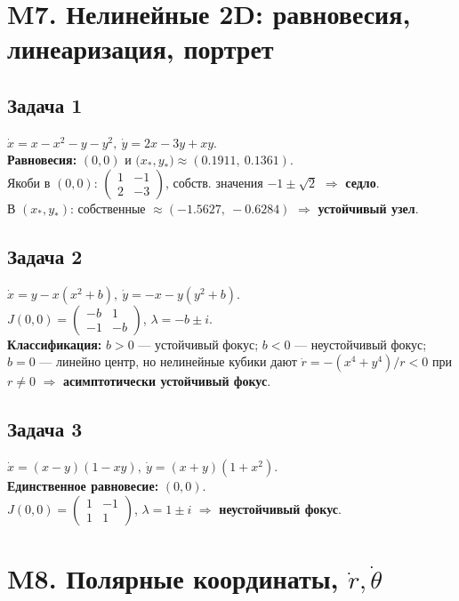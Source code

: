 \documentclass[12pt]{article}
\begin{document}
\section*{M7. Нелинейные 2D: равновесия, линеаризация, портрет}

\subsection*{Задача 1}
$\dot x=x-x^2-y-y^2,\ \dot y=2x-3y+xy$. \\
\textbf{Равновесия: } $(0,0)$ и $\bigl(x_*,y_*\bigr)\approx(0.1911,\ 0.1361)$. \\
Якоби в $(0,0)$: $\begin{pmatrix}1&-1\\2&-3\end{pmatrix}$, собств. значения $-1\pm\sqrt2$ $\Rightarrow$ \textbf{седло}. \\
В $(x_*,y_*)$: собственные $\approx(-1.5627,\ -0.6284)$ $\Rightarrow$ \textbf{устойчивый узел}.

\subsection*{Задача 2}
$\dot x=y-x(x^2+b),\ \dot y=-x-y(y^2+b)$. \\
$J(0,0)=\begin{pmatrix}-b&1\\-1&-b\end{pmatrix}$, $\lambda=-b\pm i$. \\
\textbf{Классификация: } $b>0$ — устойчивый фокус; $b<0$ — неустойчивый фокус; $b=0$ — линейно центр, но нелинейные кубики дают $\dot r=-(x^4+y^4)/r<0$ при $r\ne0$ $\Rightarrow$ \textbf{асимптотически устойчивый фокус}.

\subsection*{Задача 3}
$\dot x=(x-y)(1-xy),\ \dot y=(x+y)(1+x^2)$. \\
\textbf{Единственное равновесие: } $(0,0)$. \\
$J(0,0)=\begin{pmatrix}1&-1\\1&1\end{pmatrix}$, $\lambda=1\pm i$ $\Rightarrow$ \textbf{неустойчивый фокус}.

\section*{M8. Полярные координаты, $\dot r,\dot\theta$}
\end{document}
